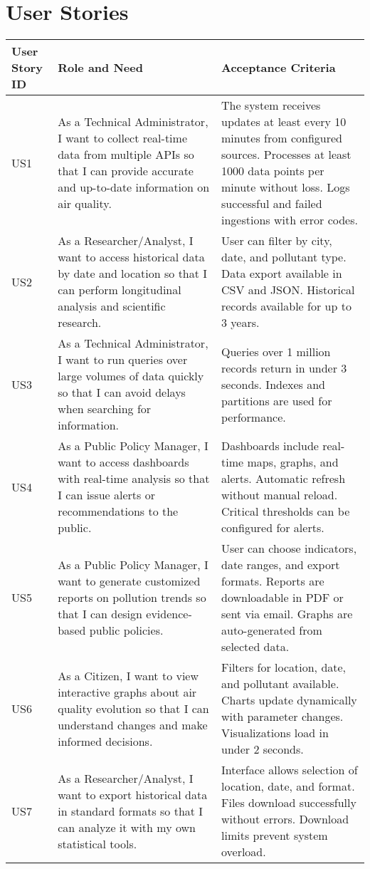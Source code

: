 \section{User Stories}

\begin{longtable}{|p{2.3cm}|p{6.3cm}|p{6.3cm}|}
\hline
\textbf{User Story ID} & \textbf{Role and Need} & \textbf{Acceptance Criteria} \\
\hline
US1 & As a Technical Administrator, I want to collect real-time data from multiple APIs so that I can provide accurate and up-to-date information on air quality. & The system receives updates at least every 10 minutes from configured sources. Processes at least 1000 data points per minute without loss. Logs successful and failed ingestions with error codes. \\
\hline
US2 & As a Researcher/Analyst, I want to access historical data by date and location so that I can perform longitudinal analysis and scientific research. & User can filter by city, date, and pollutant type. Data export available in CSV and JSON. Historical records available for up to 3 years. \\
\hline
US3 & As a Technical Administrator, I want to run queries over large volumes of data quickly so that I can avoid delays when searching for information. & Queries over 1 million records return in under 3 seconds. Indexes and partitions are used for performance. \\
\hline
US4 & As a Public Policy Manager, I want to access dashboards with real-time analysis so that I can issue alerts or recommendations to the public. & Dashboards include real-time maps, graphs, and alerts. Automatic refresh without manual reload. Critical thresholds can be configured for alerts. \\
\hline
US5 & As a Public Policy Manager, I want to generate customized reports on pollution trends so that I can design evidence-based public policies. & User can choose indicators, date ranges, and export formats. Reports are downloadable in PDF or sent via email. Graphs are auto-generated from selected data. \\
\hline
US6 & As a Citizen, I want to view interactive graphs about air quality evolution so that I can understand changes and make informed decisions. & Filters for location, date, and pollutant available. Charts update dynamically with parameter changes. Visualizations load in under 2 seconds. \\
\hline
US7 & As a Researcher/Analyst, I want to export historical data in standard formats so that I can analyze it with my own statistical tools. & Interface allows selection of location, date, and format. Files download successfully without errors. Download limits prevent system overload. \\

\end{longtable}

